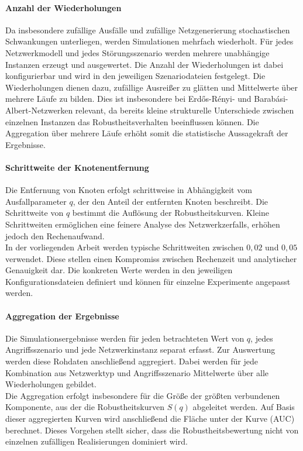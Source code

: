 \documentclass[14pt,a4paper]{scrartcl}
\begin{document}
\paragraph{Anzahl der Wiederholungen}
Da insbesondere zufällige Ausfälle und zufällige Netzgenerierung
stochastischen Schwankungen unterliegen, werden Simulationen mehrfach
wiederholt. Für jedes Netzwerkmodell und jedes Störungsszenario werden mehrere
unabhängige Instanzen erzeugt und ausgewertet. Die Anzahl der Wiederholungen
ist dabei konfigurierbar und wird in den jeweiligen Szenariodateien festgelegt.
Die Wiederholungen dienen dazu, zufällige Ausreißer zu glätten und Mittelwerte
über mehrere Läufe zu bilden. Dies ist insbesondere bei Erdős{-}Rényi- und
Barabási{-}Albert-Netzwerken relevant, da bereits kleine strukturelle
Unterschiede zwischen einzelnen Instanzen das Robustheitsverhalten
beeinflussen können. Die Aggregation über mehrere Läufe erhöht somit die
statistische Aussagekraft der Ergebnisse.

\paragraph{Schrittweite der Knotenentfernung}
Die Entfernung von Knoten erfolgt schrittweise in Abhängigkeit vom
Ausfallparameter $q$, der den Anteil der entfernten Knoten beschreibt. Die
Schrittweite von $q$ bestimmt die Auflösung der Robustheitskurven. Kleine
Schrittweiten ermöglichen eine feinere Analyse des Netzwerkzerfalls, erhöhen
jedoch den Rechenaufwand.\\
In der vorliegenden Arbeit werden typische Schrittweiten zwischen $0{,}02$ und
$0{,}05$ verwendet. Diese stellen einen Kompromiss zwischen Rechenzeit und
analytischer Genauigkeit dar. Die konkreten Werte werden in den jeweiligen
Konfigurationsdateien definiert und können für einzelne Experimente angepasst
werden.

\paragraph{Aggregation der Ergebnisse}
Die Simulationsergebnisse werden für jeden betrachteten Wert von $q$, jedes
Angriffsszenario und jede Netzwerkinstanz separat erfasst. Zur Auswertung
werden diese Rohdaten anschließend aggregiert. Dabei werden für jede
Kombination aus Netzwerktyp und Angriffsszenario Mittelwerte über alle
Wiederholungen gebildet.\\
Die Aggregation erfolgt insbesondere für die Größe der größten verbundenen
Komponente, aus der die Robustheitskurven $S(q)$ abgeleitet werden. Auf Basis
dieser aggregierten Kurven wird anschließend die Fläche unter der Kurve (AUC)
berechnet. Dieses Vorgehen stellt sicher, dass die Robustheitsbewertung nicht
von einzelnen zufälligen Realisierungen dominiert wird.
\end{document}
